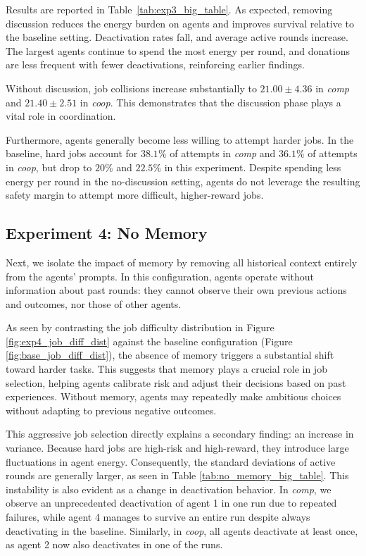 \documentclass[sigconf,nonacm]{acmart}
\begin{document}
Results are reported in Table~\ref{tab:exp3_big_table}.
As expected, removing discussion reduces the energy burden on agents and improves survival relative to the baseline setting. Deactivation rates fall, and average active rounds increase.
The largest agents continue to spend the most energy per round, and donations are less frequent with fewer deactivations, reinforcing earlier findings.

Without discussion, job collisions increase substantially to \(21.00\pm4.36\) in \textit{comp} and \(21.40\pm2.51\) in \textit{coop}.
This demonstrates that the discussion phase plays a vital role in coordination.

Furthermore, agents generally become less willing to attempt harder jobs. 
In the baseline, hard jobs account for \(38.1\%\) of attempts in \textit{comp} and \(36.1\%\) of attempts in \textit{coop}, but drop to \(20\%\) and \(22.5\%\) in this experiment.
Despite spending less energy per round in the no-discussion setting, agents do not leverage the resulting safety margin to attempt more difficult, higher-reward jobs.

\subsection{Experiment 4: No Memory}
Next, we isolate the impact of memory by removing all historical context entirely from the agents' prompts.
In this configuration, agents operate without information about past rounds: they cannot observe their own previous actions and outcomes, nor those of other agents.

As seen by contrasting the job difficulty distribution in Figure \ref{fig:exp4_job_diff_dist} against the baseline configuration (Figure \ref{fig:base_job_diff_dist}), the absence of memory triggers a substantial shift toward harder tasks.
This suggests that memory plays a crucial role in job selection, helping agents calibrate risk and adjust their decisions based on past experiences.
Without memory, agents may repeatedly make ambitious choices without adapting to previous negative outcomes.

This aggressive job selection directly explains a secondary finding: an increase in variance.
Because hard jobs are high-risk and high-reward, they introduce large fluctuations in agent energy. Consequently, the standard deviations of active rounds are generally larger, as seen in Table \ref{tab:no_memory_big_table}.
This instability is also evident as a change in deactivation behavior. 
In \textit{comp}, we observe an unprecedented deactivation of agent 1 in one run due to repeated failures, while agent 4 manages to survive an entire run despite always deactivating in the baseline.
Similarly, in \textit{coop}, all agents deactivate at least once, as agent 2 now also deactivates in one of the runs.
\end{document}
